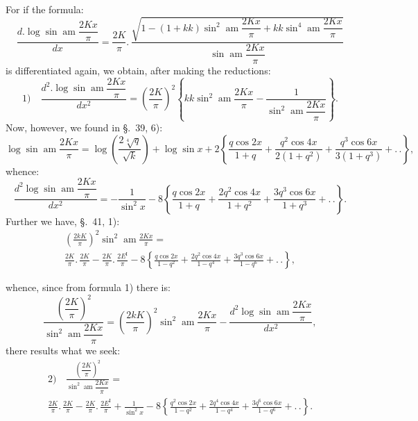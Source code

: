 \documentclass{article}
\begin{document}
For if the formula:
\[
\frac{d.\log\sin\operatorname{am}\dfrac{2Kx}{\pi}}{dx}=\frac{2K}{\pi}.\,\frac{\sqrt{1-(1+kk)\sin^{2}\operatorname{am}\dfrac{2Kx}{\pi}+kk\sin^{4}\operatorname{am}\dfrac{2Kx}{\pi}}}{\sin\operatorname{am}\dfrac{2Kx}{\pi}}
\]
is differentiated again, we obtain, after making the reductions:
\[
\text{1)}\quad\frac{d^{2}.\log\sin\operatorname{am}\dfrac{2Kx}{\pi}}{dx^{2}}=\left(\frac{2K}{\pi}\right)^{2}\left\{kk\sin^{2}\operatorname{am}\frac{2Kx}{\pi}-\frac{1}{\sin^{2}\operatorname{am}\dfrac{2Kx}{\pi}}\right\}.
\]
Now, however, we found in §.\ 39, 6):
\[
\log\sin\operatorname{am}\frac{2Kx}{\pi}=\log\left(\frac{2\sqrt[4]{q}}{\sqrt{k}}\right)+\log\sin x+2\left\{\frac{q\cos 2x}{1+q}+\frac{q^{2}\cos 4x}{2(1+q^{2})}+\frac{q^{3}\cos 6x}{3(1+q^{3})}+.\,.\right\},
\]
whence:
\[
\frac{d^{2}\log\sin\operatorname{am}\dfrac{2Kx}{\pi}}{dx^{2}}=-\frac{1}{\sin^{2}x}-8\left\{\frac{q\cos 2x}{1+q}+\frac{2q^{2}\cos 4x}{1+q^{2}}+\frac{3q^{3}\cos 6x}{1+q^{3}}+.\,.\right\}.
\]
Further we have, §.\ 41, 1):
\[
\begin{gathered}
\left(\frac{2kK}{\pi}\right)^{2}\sin^{2}\operatorname{am}\frac{2Kx}{\pi}=\\[1.5ex]
\frac{2K}{\pi}.\,\frac{2K}{\pi}-\frac{2K}{\pi}.\,\frac{2E^{\mathrm{I}}}{\pi}-8\left\{\frac{q\cos 2x}{1-q^{2}}+\frac{2q^{2}\cos 4x}{1-q^{4}}+\frac{3q^{3}\cos 6x}{1-q^{6}}+.\,.\right\},
\end{gathered}
\]

whence, since from formula 1) there is:
\[
\frac{\left(\dfrac{2K}{\pi}\right)^{2}}{\sin^{2}\operatorname{am}\dfrac{2Kx}{\pi}}=\left(\frac{2kK}{\pi}\right)^{2}\sin^{2}\operatorname{am}\frac{2Kx}{\pi}-\frac{d^{2}\log\sin\operatorname{am}\dfrac{2Kx}{\pi}}{dx^{2}},
\]
there results what we seek:
\[
\begin{gathered}
\text{2)}\quad\frac{\left(\dfrac{2K}{\pi}\right)^{2}}{\sin^{2}\operatorname{am}\dfrac{2Kx}{\pi}}=\\[1.5ex]
\frac{2K}{\pi}.\,\frac{2K}{\pi}-\frac{2K}{\pi}.\,\frac{2E^{\mathrm{I}}}{\pi}+\frac{1}{\sin^{2}x}-8\left\{\frac{q^{2}\cos 2x}{1-q^{2}}+\frac{2q^{4}\cos 4x}{1-q^{4}}+\frac{3q^{6}\cos 6x}{1-q^{6}}+.\,.\right\}.
\end{gathered}
\]
\end{document}
